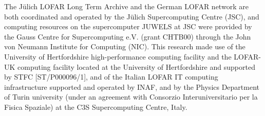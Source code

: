 \documentclass[usenatbib,fleqn,letters]{mnras}
\begin{document}
The Jülich LOFAR Long Term Archive and the German LOFAR network are both coordinated and operated by the Jülich Supercomputing Centre (JSC), and computing resources on the supercomputer JUWELS at JSC were provided by the Gauss Centre for Supercomputing e.V. (grant CHTB00) through the John von Neumann Institute for Computing (NIC). This research made use of the University of Hertfordshire high-performance computing facility and the LOFAR-UK computing facility located at the University of Hertfordshire and supported by STFC [ST/P000096/1], and of the Italian LOFAR IT computing infrastructure supported and operated by INAF, and by the Physics Department of Turin university (under an agreement with Consorzio Interuniversitario per la Fisica Spaziale) at the C3S Supercomputing Centre, Italy.


\begin{comment}
\section*{Appendix A}

\begin{figure*}
    \texttt{[image: figures/Lockman\_Unresolved\_03.png]}
    \hfill
    \texttt{[image: figures/ELAIS\_Unresolved\_03.png]}
    \caption{\label{fig:unres}The data and sigmoid fits to determine whether sources are resolved or unresolved as described in \S~\ref{subsec:highres}. The \textit{left} panel shows Lockman Hole, and the \textit{right} panel shows ELAIS-N1. }
\end{figure*}

Figure~\ref{fig:unres} shows the integrated flux density to peak brightness ratio as a function of the local signal to noise, parameterised by $\frac{S_{peak}}{2\sigma_{peak}} + \frac{S_{int}}{2\sigma_{int}}$. The data is first binned evenly in log space, and the 99.9th percentile is found in each bin. We then fit a sigmoid function:
\begin{equation}
y = A + \frac{B}{1 + (x / 96.57)^C}, 
\end{equation}
where 96.57 is a fixed value that has worked well for LoTSS \citep{shimwell_lofar_2022}. For Lockman Hole, we find 
\end{comment}







\label{lastpage}
\end{document}
